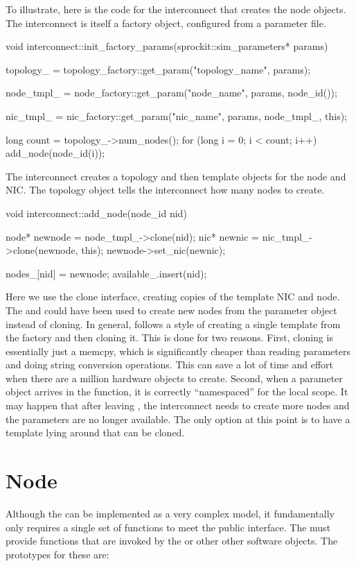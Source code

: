 To illustrate, here is the code for the interconnect that creates the node objects. 
The interconnect is itself a factory object, configured from a parameter file.

\begin{CppCode}
void
interconnect::init_factory_params(sprockit::sim_parameters* params)
{
  topology_ = topology_factory::get_param("topology_name", params);

  node_tmpl_ = node_factory::get_param("node_name", params, node_id());

  nic_tmpl_ = nic_factory::get_param("nic_name", params, node_tmpl_, this);

  long count = topology_->num_nodes();
  for (long i = 0; i < count; i++) {
    add_node(node_id(i));
  }
}
\end{CppCode}

The interconnect creates a topology and then template objects for the node and NIC.
The topology object tells the interconnect how many nodes to create.

\begin{CppCode}
void
interconnect::add_node(node_id nid)
{
  node* newnode = node_tmpl_->clone(nid);
  nic* newnic = nic_tmpl_->clone(newnode, this);
  newnode->set_nic(newnic);

  nodes_[nid] = newnode;
  available_.insert(nid);
}
\end{CppCode}

Here we use the clone interface, creating copies of the template NIC and node.
The  and  
could have been used to create new nodes from the parameter object instead of cloning.
In general, \sstmacro follows a style of creating a single template from the factory and then cloning it.
This is done for two reasons. 
First, cloning is essentially just a memcpy, which is significantly cheaper than reading parameters and doing string conversion operations.
This can save a lot of time and effort when there are a million hardware objects to create.
Second, when a parameter object arrives in the  function, it is correctly ``namespaced'' for the local scope.
It may happen that after leaving , the interconnect needs to create more nodes and the parameters are no longer available.
The only option at this point is to have a template lying around that can be cloned.

\section{Node}
Although the \nodecls can be implemented as a very complex model, it fundamentally only requires a single set of functions to meet the public interface.
The \nodecls must provide  functions that are invoked by the  or other other software objects.
The prototypes for these are:

